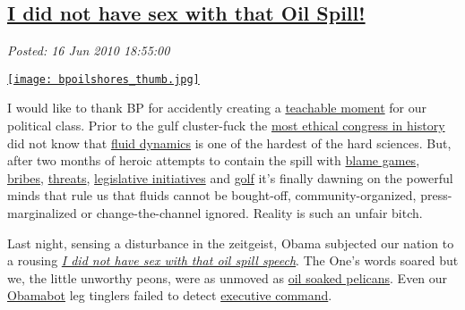 %

\subsection*{\href{https://bakerjd99.wordpress.com/2010/06/16/i-did-not-have-sex-with-that-oil-spill/}{I did not have sex with that Oil Spill!}}


\noindent\emph{Posted: 16 Jun 2010 18:55:00}
\vspace{6pt}

\captionsetup[floatingfigure]{labelformat=empty}
\begin{floatingfigure}[l]{0.33\textwidth}
\centering
\href{http://politicalhumor.about.com/b/2010/05/31/bp-were-bringing-oil-to-american-shores.htm}{\texttt{[image: bpoilshores\_thumb.jpg]}}
\label{fig:616X0}
\end{floatingfigure}I would like to thank BP for accidently creating a
\href{http://k6educators.about.com/od/educationglossary/g/gteachmoment.htm}{teachable
moment} for our political class. Prior to the gulf cluster-fuck the
\href{http://www.breitbart.tv/pelosi-still-says-she\%E2\%80\%99s-running-\%E2\%80\%98most-ethical\%E2\%80\%99-congress-ever/}{most
ethical congress in history} did not know that
\href{http://www.claymath.org/millennium/Navier-Stokes\_Equations/}{fluid
dynamics} is one of the hardest of the hard sciences. But, after two
months of heroic attempts to contain the spill with
\href{http://www.treehugger.com/files/2010/06/breaking-down-bp-gulf-spill-blame-game.php}{blame
games},
\href{http://www.free-press-release.com/news-gulf-oil-scandal-mineral-management-services-bribery-1274902506.html}{bribes},
\href{http://www.washingtonexaminer.com/opinion/blogs/beltway-confidential/with-doj-threatening-prosecution-obama-slams-bp-for-lawyering-up-95647809.html}{threats},
\href{http://www.ldjackson.net/news-politics/the-gulf-oil-spill-and-cap-and-trade/}{legislative
initiatives} and
\href{http://standbyliberty.org/2010/06/14/obama-golf-vs-the-gulf-you-decide-who-is-winning-better-yet-just-blame-bush/}{golf}
it's finally dawning on the powerful minds that rule us that fluids
cannot be bought-off, community-organized, press-marginalized or
change-the-channel ignored. Reality is such an unfair bitch.

Last night, sensing a disturbance in the zeitgeist, Obama subjected our
nation to a rousing
\emph{\href{http://www.youtube.com/watch?v=Gh76oepKFc8}{I did not have
sex with that oil spill speech}}. The One's words soared but we, the
little unworthy peons, were as unmoved as
\href{http://www.aolnews.com/opinion/article/opinion-why-this-is-the-iconic-gulf-oil-spill-picture/19503566}{oil
soaked pelicans}. Even our
\href{http://www.urbandictionary.com/define.php?term=obamabot}{Obamabot}
leg tinglers failed to detect
\href{http://www.realclearpolitics.com/video/2010/06/15/msnbc\_trashes\_obamas\_address\_compared\_to\_carter\_i\_dont\_sense\_executive\_command.html}{executive
command}.

